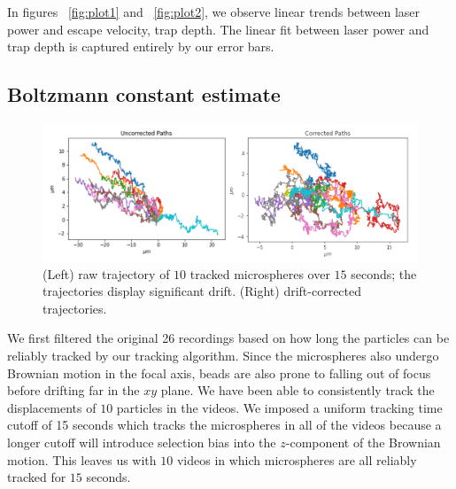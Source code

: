 \documentclass[aps,prb,twocolumn,superscriptaddress,floatfix,longbibliography,citeautoscript]{revtex4-2}
\begin{document}
In figures ~\ref{fig:plot1} and ~\ref{fig:plot2}, we observe linear trends between laser power and escape velocity, trap depth. The linear fit between laser power and trap depth is captured entirely by our error bars.



\subsection{Boltzmann constant estimate \label{sec:boltzmannCalc}}



\begin{figure}
    \centering
    \includegraphics[width=1\linewidth]{./figs/paths.png}
    \caption{(Left) raw trajectory of $10$ tracked microspheres over $15$ seconds; the trajectories display significant drift. (Right) drift-corrected trajectories.}
    \label{fig:trajCorrected}
\end{figure}
We first filtered the original 26 recordings based on how long the particles can be reliably tracked by our tracking algorithm. Since the microspheres also undergo Brownian motion in the focal axis, beads are also prone to falling out of focus before drifting far in the $xy$ plane. We have been able to consistently track the displacements of $10$ particles in the videos. We imposed a uniform tracking time cutoff of 15 seconds which tracks the microspheres in all of the videos because a longer cutoff will introduce selection bias into the $z$-component of the Brownian motion. This leaves us with $10$ videos in which microspheres are all reliably tracked for $15$ seconds. 
\end{document}
